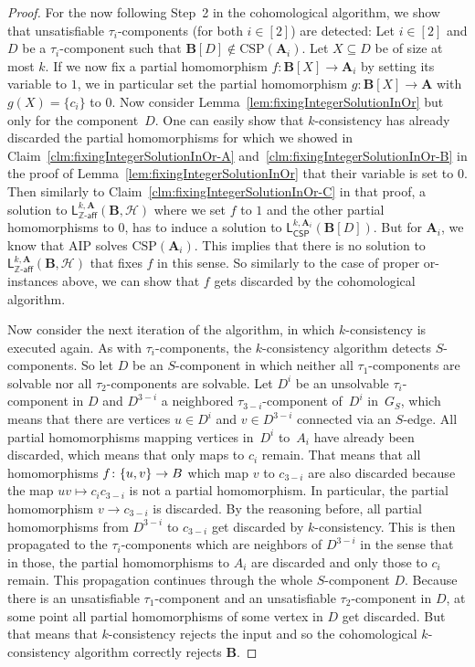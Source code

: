 \documentclass[a4paper,english, thm-restate]{lipics-v2021}
\newcommand{\ZZ}{\mathbb{Z}}
\DeclarePairedDelimiter\set{\lbrace}{\rbrace}
\newcommand{\sig}{\tau}
\newcommand{\StructA}{\mathbf{A}}
\newcommand{\StructB}{\mathbf{B}}
\newcommand{\CSP}[1]{\mathrm{CSP}(#1)}
\newcommand{\leqs}{\mathsf{L}}
\newcommand{\cspiso}[3]{\leqs^{#1,#2}_{\mathsf{CSP}}(#3)}
\newcommand{\zafkleq}[4]{\leqs^{#1,#2}_{\ZZ\mathsf{\text{-}aff}}(#3,#4)}
\newcommand{\Hh}{\mathcal{H}}
\begin{document}
\begin{proof}
		For the now  following Step~2 in the cohomological algorithm,
		we show that unsatisfiable $\sig_i$\nobreakdash-components (for both $i \in [2]$) are detected:
		Let $i\in[2]$ and $D$ be a $\sig_i$-component such that $\StructB[D] \notin \CSP{\StructA_i}$.
		Let $X \subseteq D$ be of size at most $k$.
		If we now fix a partial homomorphism $f\colon \StructB[X] \to \StructA_i$
		by setting its variable to $1$,
		we in particular set the partial homomorphism $g\colon \StructB[X] \to \StructA$ with $g(X) = \{c_i\}$ to $0$.
		Now consider Lemma~\ref{lem:fixingIntegerSolutionInOr} but only for the component~$D$.
		One can easily show that $k$-consistency has already discarded the partial homomorphisms
		for which we showed in Claim~\ref{clm:fixingIntegerSolutionInOr-A} and~\ref{clm:fixingIntegerSolutionInOr-B} in the proof of Lemma~\ref{lem:fixingIntegerSolutionInOr} that their variable is set to $0$.
		Then similarly to Claim~\ref{clm:fixingIntegerSolutionInOr-C} in that proof,
		a solution to $\zafkleq{k}{\StructA}{\StructB}{\Hh}$
		where we set $f$ to $1$ and the other partial homomorphisms to $0$,
		has to induce a solution to $\cspiso{k}{\StructA_i}{\StructB[D]}$.
		But for $\StructA_i$, we know that AIP solves $\CSP{\StructA_i}$.
		This implies that there is no solution to $\zafkleq{k}{\StructA}{\StructB}{\Hh}$ that fixes $f$ in this sense.
		So similarly to the case of proper or-instances above, we can show that
		$f$ gets discarded by the cohomological algorithm.
		
		Now consider the next iteration of the algorithm,
		in which $k$-consistency is executed again.
		As with $\sig_i$-components, the $k$-consistency algorithm detects $S$\nobreakdash-components.
		So let $D$ be an $S$\nobreakdash-component
		in which neither all $\sig_1$-components are solvable nor all $\sig_2$-components are solvable.
		Let $D^i$ be an unsolvable $\sig_i$-component in $D$ and $D^{3-i}$
		a neighbored $\sig_{3-i}$-component of~$D^i$ in~$G_S$,
		which means that there are vertices $u \in D^i$ and $v \in D^{3-i}$
		connected via an $S$-edge.
		All partial homomorphisms mapping vertices in~$D^i$ to~$A_i$ have already been discarded,
		which means that only maps to $c_i$ remain.
		That means that all homomorphisms $f \colon \set{u,v} \to B$
		which map $v$ to $c_{3-i}$ are also discarded because the map $uv \mapsto c_ic_{3-i}$ is not a partial homomorphism.
		In particular, the partial homomorphism $v\to c_{3-i}$ is discarded.
		By the reasoning before, all partial homomorphisms from $D^{3-i}$ to $c_{3-i}$
		get discarded by $k$-consistency.
		This is then propagated to the $\sig_i$-components which are neighbors of $D^{3-i}$ in the sense that in those, the partial homomorphisms to $A_i$ are discarded and only those to $c_i$ remain.
		This propagation continues through the whole $S$-component $D$.
		Because there is an  unsatisfiable $\sig_1$-component and an unsatisfiable $\sig_2$-component in $D$, 
		at some point all partial homomorphisms of some vertex in $D$ get discarded.
		But that means that $k$-consistency rejects the input
		and so the cohomological $k$-consistency algorithm correctly rejects $\StructB$.
	\end{proof}		
	
\end{document}

